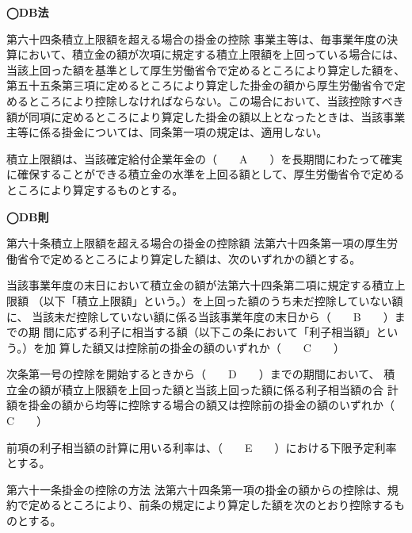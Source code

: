 \begin{fillblank}[数理人試験 2024 問題1 設問1 A〜F]
    \noindent \textbf{◯DB法}
  \begin{lawstructure}
    \begin{lawarticle}{第六十四条}{積立上限額を超える場合の掛金の控除}
      事業主等は、毎事業年度の決算において、積立金の額が次項に規定する積立上限額を上回っている場合には、当該上回った額を基準として厚生労働省令で定めるところにより算定した額を、第五十五条第三項に定めるところにより算定した掛金の額から厚生労働省令で定めるところにより控除しなければならない。この場合において、当該控除すべき額が同項に定めるところにより算定した掛金の額以上となったときは、当該事業主等に係る掛金については、同条第一項の規定は、適用しない。
    
      積立上限額は、当該確定給付企業年金の（　　A　　）を長期間にわたって確実に確保することができる積立金の水準を上回る額として、厚生労働省令で定めるところにより算定するものとする。
    \end{lawarticle}
  \end{lawstructure}

    \noindent \textbf{◯DB則}
  \begin{lawstructure}
    \begin{lawarticle}{第六十条}{積立上限額を超える場合の掛金の控除額}
      法第六十四条第一項の厚生労働省令で定めるところにより算定した額は、次のいずれかの額とする。

      当該事業年度の末日において積立金の額が法第六十四条第二項に規定する積立上限額
      （以下「積立上限額」という。）を上回った額のうち未だ控除していない額に、
      当該未だ控除していない額に係る当該事業年度の末日から（　　B　　）までの期
      間に応ずる利子に相当する額（以下この条において「利子相当額」という。）を加
      算した額又は控除前の掛金の額のいずれか（　　C　　）

      次条第一号の控除を開始するときから（　　D　　）までの期間において、
      積立金の額が積立上限額を上回った額と当該上回った額に係る利子相当額の合
      計額を掛金の額から均等に控除する場合の額又は控除前の掛金の額のいずれか（　　C　　）

        前項の利子相当額の計算に用いる利率は、（　　E　　）における下限予定利率とする。
    \end{lawarticle}
  \end{lawstructure}

  \begin{lawstructure}
    \begin{lawarticle}{第六十一条}{掛金の控除の方法}
      法第六十四条第一項の掛金の額からの控除は、規約で定めるところにより、前条の規定により算定した額を次のとおり控除するものとする。


\end{lawarticle}
\end{lawstructure}
\end{fillblank}
